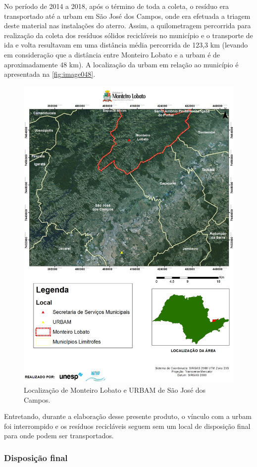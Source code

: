 	
	No período de 2014 a 2018, após o término de toda a coleta, o resíduo era transportado até a \gls{urbam} em São José dos Campos, onde era efetuada a triagem deste material nas instalações do aterro. Assim, a quilometragem percorrida para realização da coleta dos resíduos sólidos recicláveis no município e o transporte de ida e volta resultavam em uma distância média percorrida de 123,3 km (levando em consideração que a distância entre Monteiro Lobato e a \gls{urbam} é de aproximadamente 48 km). A localização da \gls{urbam} em relação ao município é apresentada na \autoref{fig:image048}.
	
	\begin{figure}
		\centering
		\includegraphics[width=0.75\linewidth]{produtos/prodtres/image048}
		\caption{Localização de Monteiro Lobato e URBAM de São José dos Campos.}
		\label{fig:image048}
	\end{figure}
	
	Entretando,  durante a elaboração desse presente produto, o vínculo com a \gls{urbam} foi interrompido e os resíduos recicláveis seguem sem um local de disposição final para onde podem ser transportados.
	
	\subsubsection{Disposição final}
	
